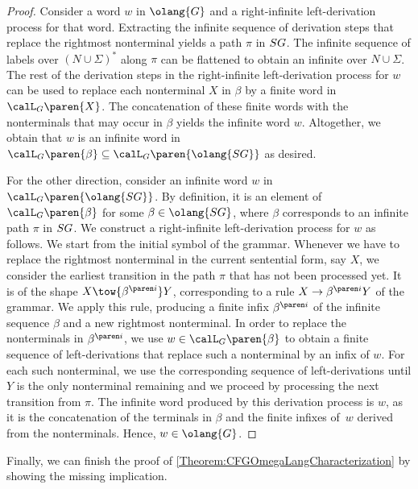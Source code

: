 \documentclass[../../diss.tex]{subfiles}
\begin{document}
\begin{proof}
    Consider a word $w$ in $\olang{G}$ and a right-infinite left-derivation process for that word.
    Extracting the infinite sequence of derivation steps that replace the rightmost nonterminal yields a path $\pi$ in $SG$.
    The infinite sequence of labels over ${(N \cup \Sigma)}^*$ along $\pi$ can be flattened to obtain an infinite  over $N \cup \Sigma$.
    The rest of the derivation steps in the right-infinite left-derivation process for $w$ can be used to replace each nonterminal $X$ in $\beta$ by a finite word in $\calL_G\paren{X}$.
    The concatenation of these finite words with the nonterminals that may occur in $\beta$ yields the infinite word $w$.
    Altogether, we obtain that $w$ is an infinite word in $\calL_G\paren{\beta} \subseteq \calL_G\paren{\olang{\SpinalGraph}}$ as desired.

    For the other direction, consider an infinite word $w$ in $\calL_G\paren{\olang{\SpinalGraph}}$.
    By definition, it is an element of $\calL_G\paren{\beta}$ for some $\beta \in \olang{\SpinalGraph}$, where $\beta$ corresponds to an infinite path $\pi$ in $SG$.
    We construct a right-infinite left-derivation process for $w$ as follows.
    We start from the initial symbol of the grammar.
    Whenever we have to replace the rightmost nonterminal in the current sentential form, say $X$, we consider the earliest transition in the path $\pi$ that has not been processed yet.
    It is of the shape $X \tow{\itr{\beta}{i}} Y$, corresponding to a rule $X \to \itr{\beta}{i}Y$ of the grammar.
    We apply this rule, producing a finite infix $\itr{\beta}{i}$ of the infinite sequence $\beta$ and a new rightmost nonterminal.
    In order to replace the nonterminals in $\itr{\beta}{i}$, we use $w \in \calL_G\paren{\beta}$ to obtain a finite sequence of left-derivations that replace such a nonterminal by an infix of $w$.
    For each such nonterminal, we use the corresponding sequence of left-derivations until $Y$ is the only nonterminal remaining and we proceed by processing the next transition from $\pi$.
    The infinite word produced by this derivation process is $w$, as it is the concatenation of the terminals in $\beta$ and the finite infixes of~$w$ derived from the nonterminals.
    Hence, $w \in \olang{G}$.
\end{proof}

Finally, we can finish the proof of \cref{Theorem:CFGOmegaLangCharacterization}
by showing the missing implication.
\end{document}
